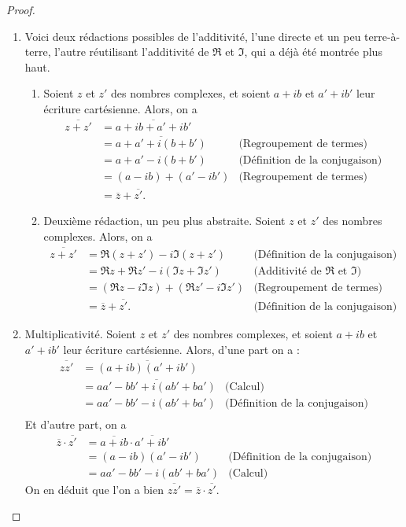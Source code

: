 \begin{proof}
\begin{enumerate}
\item Voici deux rédactions possibles de l'additivité, l'une directe et un peu \og terre-à-terre\fg, l'autre réutilisant l'additivité de $\Re$ et $\Im$, qui a déjà été montrée plus haut.
\begin{enumerate}
\item Soient $z$ et $z'$ des nombres complexes, et soient $a+ib$ et $a'+ib'$ leur écriture cartésienne. Alors, on a 
\begin{align*}
\overline{z+z'} &= \overline{a+ib+a'+ib'}\\
&= \overline{a+a'+i(b+b')} &\text{(Regroupement de termes)}\\
&=a+a'-i(b+b')& \text{(Définition de la conjugaison)}\\
&=(a-ib)+(a'-ib') & \text{(Regroupement de termes)}\\
&= \overline{z}+\overline{z'}.
\end{align*}
\item Deuxième rédaction, un peu plus abstraite. Soient $z$ et $z'$ des nombres complexes. Alors, on a
\begin{align*}
\overline{z+z'} &= \Re(z+z')-i\Im(z+z') &\text{(Définition de la conjugaison)}\\
&= \Re z+\Re z' -i\left(\Im z+\Im z'\right) & \text{(Additivité de $\Re$ et $\Im$)}\\
&=\left(\Re z- i\Im z\right) + \left(\Re z'- i\Im z'\right) & \text{(Regroupement de termes)}\\
&= \overline{z} + \overline{z'}. & \text{(Définition de la conjugaison)}
\end{align*}
\end{enumerate}

\item Multiplicativité. Soient $z$ et $z'$ des nombres complexes, et soient $a+ib$ et $a'+ib'$ leur écriture cartésienne. Alors, d'une part on a :
\begin{align*}
\overline{zz'} &= \overline{(a+ib)(a'+ib')}\\
&=\overline{aa'-bb'+i(ab'+ba')} & \text{(Calcul)}\\
&=aa'-bb'-i(ab'+ba')& \text{(Définition de la conjugaison)}\\
\end{align*}
Et d'autre part, on a 
\begin{align*}
\overline{z}\cdot \overline{z'} &= \overline{a+ib}\cdot \overline{a'+ib'}\\
&=(a-ib)(a'-ib')& \text{(Définition de la conjugaison)}\\
&=aa'-bb'-i(ab'+ba') & \text{(Calcul)}
\end{align*}
On en déduit que l'on a bien $\overline{zz'} = \overline{z}\cdot\overline{z'}$.
\end{enumerate}
\end{proof}



